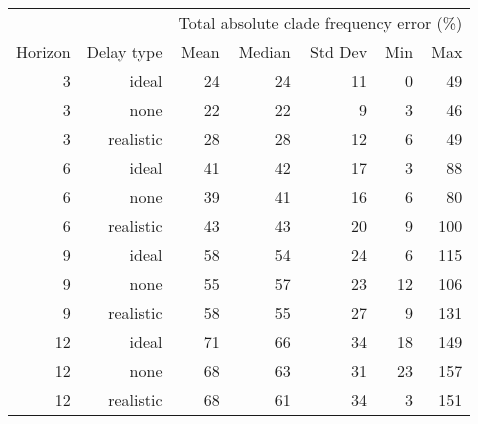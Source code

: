 
\begin{tabular*}{0.7\textwidth}{rrrrrrr}
\toprule
        &            & \multicolumn{5}{c}{Total absolute clade frequency error (\%)} \\
Horizon & Delay type & Mean & Median & Std Dev & Min & Max \\
\midrule

3 & ideal & 24 & 24 & 11 & 0 & 49 \\
3 & none & 22 & 22 & 9 & 3 & 46 \\
3 & realistic & 28 & 28 & 12 & 6 & 49 \\
6 & ideal & 41 & 42 & 17 & 3 & 88 \\
6 & none & 39 & 41 & 16 & 6 & 80 \\
6 & realistic & 43 & 43 & 20 & 9 & 100 \\
9 & ideal & 58 & 54 & 24 & 6 & 115 \\
9 & none & 55 & 57 & 23 & 12 & 106 \\
9 & realistic & 58 & 55 & 27 & 9 & 131 \\
12 & ideal & 71 & 66 & 34 & 18 & 149 \\
12 & none & 68 & 63 & 31 & 23 & 157 \\
12 & realistic & 68 & 61 & 34 & 3 & 151 \\

\bottomrule
\end{tabular*}

